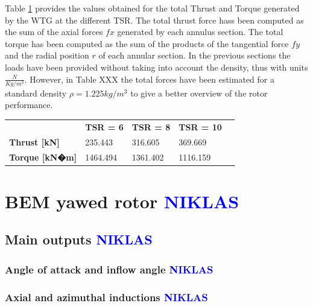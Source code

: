 Table \ref{total_forces_alligned} provides the values obtained for the total Thrust and Torque generated by the WTG at the different TSR. The total thrust force hass been computed as the sum of the axial forces $fx$ generated by each annulus section. The total torque has been computed as the sum of the products of the tangential force $fy$ and the radial position $r$ of each annular section. In the previous sections the loads have been provided without taking into account the density, thus with units $ \frac{N}{Kg/m^3} $. However, in Table XXX the total forces have been estimated for a standard density $\rho = 1.225 kg/m^3$ to give a better overview of the rotor performance.

\begin{table}[htpb]
\begin{tabular}{lllll}
\cline{2-4}
\multicolumn{1}{l|}{}                            & \multicolumn{1}{l|}{\textbf{TSR = 6}} & \multicolumn{1}{l|}{\textbf{TSR = 8}} & \multicolumn{1}{l|}{\textbf{TSR = 10}} &  \\ \cline{1-4}
\multicolumn{1}{|l|}{\textbf{Thrust {[}kN{]}}}   & \multicolumn{1}{l|}{235.443}          & \multicolumn{1}{l|}{316.605}          & \multicolumn{1}{l|}{369.669}           &  \\ \cline{1-4}
\multicolumn{1}{|l|}{\textbf{Torque {[}kN�m{]}}} & \multicolumn{1}{l|}{1464.494}         & \multicolumn{1}{l|}{1361.402}         & \multicolumn{1}{l|}{1116.159}          &  \\ \cline{1-4}
\end{tabular}
\label{total_forces_alligned}
\end{table}


\section{BEM yawed rotor \textcolor{blue}{NIKLAS}}


\subsection{Main outputs \textcolor{blue}{NIKLAS}}


\subsubsection{Angle of attack and inflow angle \textcolor{blue}{NIKLAS}}

\subsubsection{Axial and azimuthal inductions \textcolor{blue}{NIKLAS}}

